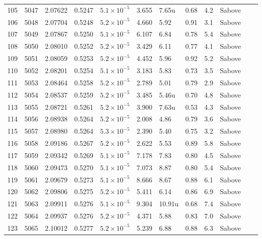 \begin{longtable}{@{}rrllllllllll@{}}
 105 & 5047 & 2.07622 & 0.5247 & $5.1\times10^{-5}$ & 3.655 & 7.65u & 0.68 & 4.2 & Sabove &  &  \\
 106 & 5048 & 2.07704 & 0.5248 & $5.2\times10^{-5}$ & 4.660 & 5.92 & 0.91 & 3.1 & Sabove &  &  \\
 107 & 5049 & 2.07867 & 0.5250 & $5.1\times10^{-5}$ & 6.107 & 6.84 & 0.78 & 5.4 & Sabove &  &  \\
 108 & 5050 & 2.08010 & 0.5252 & $5.2\times10^{-5}$ & 3.429 & 6.11 & 0.77 & 4.1 & Sabove &  &  \\
 109 & 5051 & 2.08059 & 0.5253 & $5.2\times10^{-5}$ & 4.452 & 5.96 & 0.92 & 5.2 & Sabove &  &  \\
 110 & 5052 & 2.08201 & 0.5254 & $5.1\times10^{-5}$ & 3.183 & 5.83 & 0.73 & 3.5 & Sabove &  &  \\
 111 & 5053 & 2.08464 & 0.5258 & $5.2\times10^{-5}$ & 2.789 & 5.01 & 0.79 & 2.9 & Sabove &  &  \\
 112 & 5054 & 2.08537 & 0.5259 & $5.2\times10^{-5}$ & 3.485 & 5.46u & 0.70 & 4.8 & Sabove &  &  \\
 113 & 5055 & 2.08721 & 0.5261 & $5.2\times10^{-5}$ & 3.900 & 7.63u & 0.53 & 4.3 & Sabove &  &  \\
 114 & 5056 & 2.08938 & 0.5264 & $5.2\times10^{-5}$ & 2.008 & 4.86 & 0.79 & 3.6 & Sabove &  &  \\
 115 & 5057 & 2.08980 & 0.5264 & $5.3\times10^{-5}$ & 2.390 & 5.40 & 0.75 & 3.2 & Sabove &  &  \\
 116 & 5058 & 2.09186 & 0.5267 & $5.2\times10^{-5}$ & 2.622 & 5.53 & 0.89 & 5.8 & Sabove &  &  \\
 117 & 5059 & 2.09342 & 0.5269 & $5.1\times10^{-5}$ & 7.178 & 7.83 & 0.80 & 4.5 & Sabove &  &  \\
 118 & 5060 & 2.09473 & 0.5270 & $5.1\times10^{-5}$ & 7.073 & 8.87 & 0.80 & 5.4 & Sabove &  &  \\
 119 & 5061 & 2.09679 & 0.5273 & $5.1\times10^{-5}$ & 8.666 & 8.67 & 0.88 & 6.1 & Sabove &  &  \\
 120 & 5062 & 2.09806 & 0.5275 & $5.2\times10^{-5}$ & 5.411 & 6.14 & 0.86 & 6.9 & Sabove &  &  \\
 121 & 5063 & 2.09911 & 0.5276 & $5.1\times10^{-5}$ & 9.304 & 10.91u & 0.68 & 7.4 & Sabove &  &  \\
 122 & 5064 & 2.09937 & 0.5276 & $5.2\times10^{-5}$ & 4.371 & 5.88 & 0.83 & 7.0 & Sabove &  &  \\
 123 & 5065 & 2.10012 & 0.5277 & $5.2\times10^{-5}$ & 5.239 & 6.88 & 0.88 & 6.3 & Sabove &  &  \\

\end{longtable}
